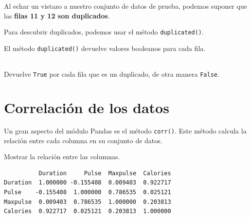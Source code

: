 Al echar un vistazo a nuestro conjunto de datos de prueba, podemos
suponer que las \textbf{filas 11 y 12 son duplicados}.

Para descubrir duplicados, podemos usar el método \texttt{duplicated()}.

El método \texttt{duplicated()} devuelve valores booleanos para cada fila.\\ \\

\begin{code} Devuelve \texttt{True} por cada fila que es un duplicado, de otra manera \texttt{False}.

\begin{Shaded}
\begin{Highlighting}[]
\end{Highlighting}
\end{Shaded}
\end{code}

\section{Correlación de los datos}

Un gran aspecto del módulo Pandas es el método \texttt{corr()}. Este
método calcula la relación entre cada columna en su conjunto de datos.

\begin{code} Mostrar la relación entre las columnas.

\begin{Shaded}
\begin{Highlighting}[]

\OperatorTok{=}\NormalTok{)}

\end{Highlighting}
\end{Shaded}

\begin{verbatim}
          Duration     Pulse  Maxpulse  Calories
Duration  1.000000 -0.155408  0.009403  0.922717
Pulse    -0.155408  1.000000  0.786535  0.025121
Maxpulse  0.009403  0.786535  1.000000  0.203813
Calories  0.922717  0.025121  0.203813  1.000000
\end{verbatim}
\end{code}

